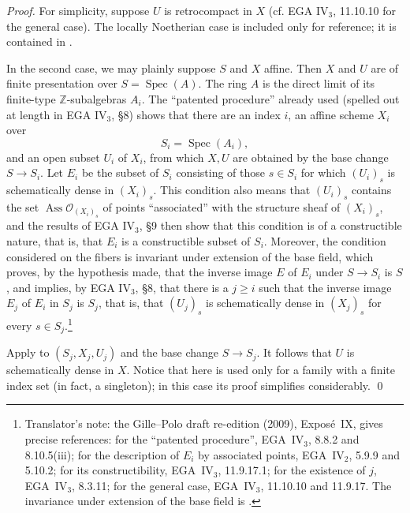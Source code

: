 \emph{Proof.}
For simplicity, suppose \(U\) is retrocompact in \(X\) (cf. EGA
IV\(_3\), 11.10.10 for the general case). The locally
Noetherian case is included only for reference; it is contained in
.

In the second case, we may plainly suppose \(S\) and \(X\) affine. Then
\(X\) and \(U\) are of finite presentation over
\(S=\operatorname{Spec}(A)\). The ring \(A\) is the direct limit of its
finite-type \(\mathbb Z\)-subalgebras \(A_i\). The ``patented
procedure'' already used (spelled out at length in EGA IV\(_3\), \S8)
shows that there are an index \(i\), an affine scheme \(X_i\) over
\[
  S_i=\operatorname{Spec}(A_i),
\]
and an open subset \(U_i\) of \(X_i\), from which \(X,U\) are obtained
by the base change \(S\to S_i\). Let \(E_i\) be the subset of \(S_i\)
consisting of those \(s\in S_i\) for which \((U_i)_s\) is schematically
dense in \((X_i)_s\). This condition also means that \((U_i)_s\)
contains the set \(\operatorname{Ass}\mathscr O_{(X_i)_s}\) of points
``associated'' with the structure sheaf of \((X_i)_s\), and the results of
EGA IV\(_3\), \S9 then show that this condition is of a constructible
nature, that is, that \(E_i\) is a constructible subset of \(S_i\).
Moreover, the condition considered on the fibers is invariant under
extension of the base field, which proves, by the hypothesis made, that
the inverse image \(E\) of \(E_i\) under \(S\to S_i\) is \(S\), and
implies, by EGA IV\(_3\), \S8, that there is a \(j\geq i\) such that the
inverse image \(E_j\) of \(E_i\) in \(S_j\) is \(S_j\), that is, that
\((U_j)_s\) is schematically dense in \((X_j)_s\) for every
\(s\in S_j\).\footnote{Translator's note: the Gille--Polo draft re-edition
(2009), Expos\'e~IX, gives precise references: for the ``patented
procedure'', EGA~IV\(_3\), 8.8.2 and 8.10.5(iii); for the description of
\(E_i\) by associated points, EGA~IV\(_2\), 5.9.9 and 5.10.2; for its
constructibility, EGA~IV\(_3\), 11.9.17.1; for the existence of \(j\),
EGA~IV\(_3\), 8.3.11; for the general case, EGA~IV\(_3\), 11.10.10 and
11.9.17. The invariance under extension of the base field is
.}

Apply  to
\((S_j,X_j,U_j)\) and the base change \(S\to S_j\). It follows that
\(U\) is schematically dense in \(X\). Notice that here
 is used only
for a family with a finite index set (in fact, a singleton); in this
case its proof simplifies considerably. \qed

